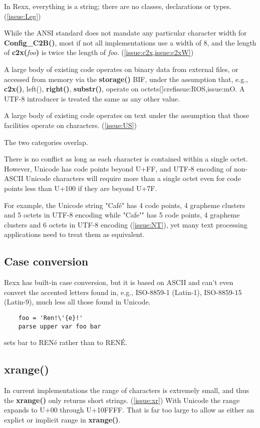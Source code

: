 \documentclass[b4paper]{article}
\begin{document}
In Rexx, everything is a string; there are no classes, declarations or types. (\cref{issue:Leg})

While the ANSI standard does not mandate any particular character width for \textbf{Config\_C2B()},
most if not all implementations use a width of 8,
and the length of \textbf{c2x(}\textit{foo}\textbf{)}
is twice the length of \textit{foo}. (\cref{issue:c2x,issue:c2xW})

A large body of existing code operates on binary data from external files,
or accessed from memory via the \textbf{storage()} BIF,
under the assumption that, e.g., \textbf{c2x()}, left(), \textbf{right()}, \textbf{substr()}, operate on octets(]cref{issue:ROS,issue:mO}.
A UTF-8 introducer is treated the same as any other value.

A large body of existing code operates on text under the assumption
that those facilities operate on characters. (\cref{issue:US})

The two categories overlap.

There is no conflict as long as each character is contained within a single octet.
However, Unicode has code points beyond U+FF,
and UTF-8 encoding of non-ASCII Unicode characters will
require more than a single octet even for code points less than U+100 if they are beyond U+7F.

For example, the Unicode string "Caf\'{e}" has 4 code points, 4
grapheme clusters and 5 octets in UTF-8 encoding while
"Cafe\textbf{\'{ }}" has 5 code points, 4 grapheme clusters and 6 octets
in UTF-8 encoding (\cref{issue:NT}), yet many text processing applications need to treat
them as equivalent.

\subsection{Case conversion}
Rexx has built-in case conversion, but it is based on ASCII and
can't even convert the accented letters found in, e.g., ISO-8859-1
(Latin-1), ISO-8859-15 (Latin-9), much less all those found in Unicode.

\begin{lstlisting}
    foo = 'Ren!\'{e}!'
    parse upper var foo bar
\end{lstlisting}

sets bar to REN\'{e} rather than to REN\'{E}.

\subsection{\textbf{xrange()}}
In current implementations the range of characters is extremely small,
and thus the \textbf{xrange()} only returns short strings. (\cref{issue:xr})
With Unicode the range expands to U+00 through U+10FFFF.
That is far too large to allow as either an explict or implicit range in \textbf{xrange()}.
\end{document}
